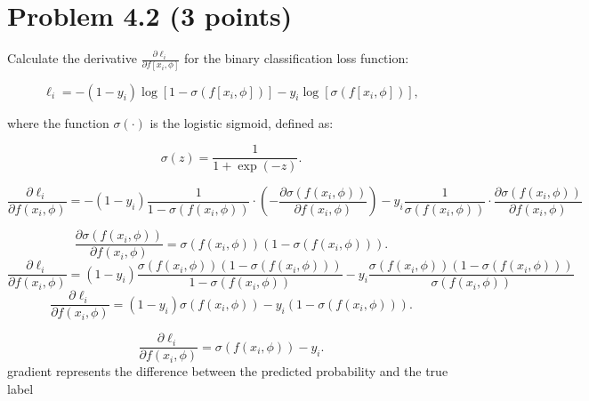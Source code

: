 \documentclass[10pt]{article}
\begin{document}
\vspace{2em}
\section*{Problem 4.2 (3 points)}

Calculate the derivative \( \frac{\partial \ell_i}{\partial f[x_i, \phi]} \) for the binary 
classification loss function:

\begin{equation}
\ell_i = -(1 - y_i) \log [1 - \sigma(f[x_i, \phi])] - y_i \log [\sigma(f[x_i, \phi])],
\end{equation}

where the function \( \sigma(\cdot) \) is the logistic sigmoid, defined as:

\begin{equation}
\sigma(z) = \frac{1}{1 + \exp(-z)}.
\end{equation}

\vspace{5em}
\[
\frac{\partial \ell_i}{\partial f(x_i, \phi)} = -(1 - y_i) \frac{1}{1 - \sigma(f(x_i, \phi))} \cdot \left( -\frac{\partial \sigma(f(x_i, \phi))}{\partial f(x_i, \phi)} \right) 
- y_i \frac{1}{\sigma(f(x_i, \phi))} \cdot \frac{\partial \sigma(f(x_i, \phi))}{\partial f(x_i, \phi)}
\]

\[
\frac{\partial \sigma(f(x_i, \phi))}{\partial f(x_i, \phi)} = \sigma(f(x_i, \phi)) (1 - \sigma(f(x_i, \phi))).
\]
\[
\frac{\partial \ell_i}{\partial f(x_i, \phi)} = (1 - y_i) \frac{\sigma(f(x_i, \phi)) (1 - \sigma(f(x_i, \phi)))}{1 - \sigma(f(x_i, \phi))} - y_i \frac{\sigma(f(x_i, \phi)) (1 - \sigma(f(x_i, \phi)))}{\sigma(f(x_i, \phi))}
\]
\[
\frac{\partial \ell_i}{\partial f(x_i, \phi)} = (1 - y_i) \sigma(f(x_i, \phi)) - y_i (1 - \sigma(f(x_i, \phi))).
\]

\begin{equation}
    \frac{\partial \ell_i}{\partial f(x_i, \phi)} = \sigma(f(x_i, \phi)) - y_i.
\end{equation}
gradient represents the difference between the predicted probability and the true label
\end{document}
